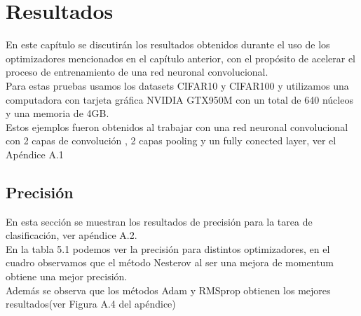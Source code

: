 \chapter{Resultados}
En este capítulo se discutirán los resultados obtenidos durante el uso de los optimizadores mencionados en el capítulo anterior, con el propósito de acelerar el proceso de entrenamiento de una red neuronal convolucional.\\ Para estas pruebas usamos los datasets CIFAR10 y CIFAR100 y utilizamos una computadora con tarjeta gráfica NVIDIA  GTX950M con un total de 640 núcleos y una memoria de 4GB.\\
Estos ejemplos fueron obtenidos al trabajar con una red neuronal convolucional con 2 capas de convolución , 2 capas pooling y un fully conected layer, ver el Apéndice A.1


\section{Precisión}
En esta sección se muestran los resultados de precisión para la tarea de clasificación, ver apéndice A.2.\\ En la tabla 5.1 podemos ver la precisión para distintos optimizadores, en el cuadro observamos que el método Nesterov al ser una mejora de momentum obtiene una mejor precisión.\\Además se observa que los métodos Adam y RMSprop obtienen los mejores resultados(ver Figura A.4 del apéndice)
